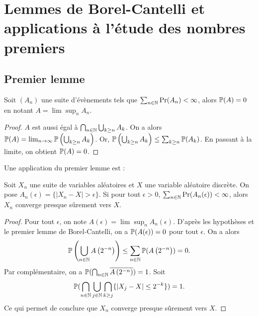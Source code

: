 \documentclass[../main.tex]{subfiles}
\begin{document}
\section{Lemmes de Borel-Cantelli et applications à l'étude des nombres premiers}
\subsection*{Premier lemme}
\begin{lemma} Soit \((A_n)\) une suite d'évènements tels que \(\sum_{n\in\mathbb{N}} \Pr(A_n)<\infty\),
    alors \(\mathbb{P}(A) = 0\) en notant \(A = \lim\displaystyle\sup_{n} A_n\).
\end{lemma}
\begin{proof} \(A\) est aussi égal à \(\bigcap_{n\in\mathbb{N}}\bigcup_{k\geq n} A_k\).
    On a alors \(\mathbb{P}(A) = \lim_{n\to\infty} \mathbb{P}\left(\bigcup_{k\geq n} A_k\right)\).
    Or, \(\mathbb{P}\left(\bigcup_{k\geq n} A_k\right)\leq \sum_{k\geq n} \mathbb{P}(A_k)\).
    En passant à la limite, on obtient \(\mathbb{P}(A) = 0\).
\end{proof}
Une application du premier lemme est :
\begin{proposition} Soit \(X_n\) une suite de variables aléatoires et \(X\) une variable aléatoire discrète.
    On pose \(A_n(\epsilon) = \{\lvert X_n - X\rvert > \epsilon\}\). Si pour tout \(\epsilon>0\), \(\sum_{n\in\mathbb{N}} \Pr(A_n(\epsilon))<\infty\), alors
    \(X_n\) converge presque sûrement vers \(X\).
\end{proposition}
\begin{proof} Pour tout \(\epsilon\), on note \(A(\epsilon) = \lim\sup_n A_n(\epsilon)\). D'après les hypothèses et
    le premier lemme de Borel-Cantelli, on a \(\mathbb{P}(A(\epsilon)) = 0\) pour tout \(\epsilon\).
    On a alors
    \begin{equation}
        \mathbb{P}\left(\bigcup_{n\in \mathbb{N}}A\left(2^{-n}\right)\right) \le \sum_{n\in\mathbb{N}} \mathbb{P}(A\left(2^{-n}\right)) = 0.
    \end{equation}
    Par complémentaire, on a \(\mathbb{P}(\bigcap_{n\in \mathbb{N}}\overline{A\left(2^{-n}\right)}) = 1\). Soit 
    \begin{equation}
        \mathbb{P}(\bigcap_{n\in \mathbb{N}}\bigcup_{j\in \mathbb{N}}\bigcap_{k\ge j}\{\lvert X_j - X\rvert \le 2^{-k}\}) = 1.
    \end{equation}
    Ce qui permet de conclure que \(X_n\) converge presque sûrement vers \(X\).

\end{proof}
\end{document}
